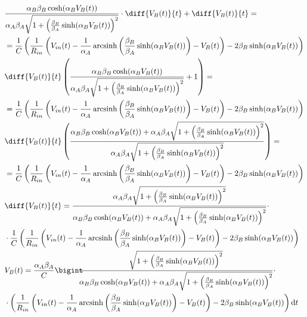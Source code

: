 \documentclass[12pt]{article}
\DeclareMathOperator{\arcsinh}{arcsinh}
\newcommand{\Int}[2]{\bigint \hspace{-6px} #1 \mathrm{d}#2}
\begin{document}
		\begin{equation}
			\label{eq:sostituzione}
			\begin{split}
				&\frac{\alpha_{B}\beta_{B}\cosh(\alpha_{B}V_{B}(t))}{\alpha_{A}\beta_{A}\sqrt{1+\left(\frac{\beta_{B}}{\beta_{A}}\sinh(\alpha_{B}V_{B}(t))\right)^{2}}}\cdot\diff{V_{B}(t)}{t}+\diff{V_{B}(t)}{t} =\\&= \frac{1}{C}\left(\frac{1}{R_{in}}\left(V_{in}(t)-\frac{1}{\alpha_{A}} \arcsinh \left(\frac{\beta_{B}}{\beta_{A}} \sinh(\alpha_{B}V_{B}(t))\right)-V_{B}(t)\right)-2\beta_{B}\sinh(\alpha_{B}V_{B}(t))\right)\\
				&\diff{V_{B}(t)}{t}\left(\frac{\alpha_{B}\beta_{B}\cosh(\alpha_{B}V_{B}(t))}{\alpha_{A}\beta_{A}\sqrt{1+\left(\frac{\beta_{B}}{\beta_{A}}\sinh(\alpha_{B}V_{B}(t))\right)^{2}}}+1\right) =\\&= \frac{1}{C}\left(\frac{1}{R_{in}}\left(V_{in}(t)-\frac{1}{\alpha_{A}} \arcsinh \left(\frac{\beta_{B}}{\beta_{A}} \sinh(\alpha_{B}V_{B}(t))\right)-V_{B}(t)\right)-2\beta_{B}\sinh(\alpha_{B}V_{B}(t))\right)\\
				&\diff{V_{B}(t)}{t}\left(\frac{\alpha_{B}\beta_{B}\cosh(\alpha_{B}V_{B}(t))+\alpha_{A}\beta_{A}\sqrt{1+\left(\frac{\beta_{B}}{\beta_{A}}\sinh(\alpha_{B}V_{B}(t))\right)^{2}}}{\alpha_{A}\beta_{A}\sqrt{1+\left(\frac{\beta_{B}}{\beta_{A}}\sinh(\alpha_{B}V_{B}(t))\right)^{2}}}\right) =\\&= \frac{1}{C}\left(\frac{1}{R_{in}}\left(V_{in}(t)-\frac{1}{\alpha_{A}} \arcsinh \left(\frac{\beta_{B}}{\beta_{A}} \sinh(\alpha_{B}V_{B}(t))\right)-V_{B}(t)\right)-2\beta_{B}\sinh(\alpha_{B}V_{B}(t))\right)\\
				&\diff{V_{B}(t)}{t} = \frac{\alpha_{A}\beta_{A}\sqrt{1+\left(\frac{\beta_{B}}{\beta_{A}}\sinh(\alpha_{B}V_{B}(t))\right)^{2}}}{\alpha_{B}\beta_{B}\cosh(\alpha_{B}V_{B}(t))+\alpha_{A}\beta_{A}\sqrt{1+\left(\frac{\beta_{B}}{\beta_{A}}\sinh(\alpha_{B}V_{B}(t))\right)^{2}}}\cdot\\&\cdot\frac{1}{C}\left(\frac{1}{R_{in}}\left(V_{in}(t)-\frac{1}{\alpha_{A}} \arcsinh \left(\frac{\beta_{B}}{\beta_{A}} \sinh(\alpha_{B}V_{B}(t))\right)-V_{B}(t)\right)-2\beta_{B}\sinh(\alpha_{B}V_{B}(t))\right)\\
				&V_{B}(t) = \frac{\alpha_{A}\beta_{A}}{C}\Int{\frac{\sqrt{1+\left(\frac{\beta_{B}}{\beta_{A}}\sinh(\alpha_{B}V_{B}(t))\right)^{2}}}{\alpha_{B}\beta_{B}\cosh(\alpha_{B}V_{B}(t))+\alpha_{A}\beta_{A}\sqrt{1+\left(\frac{\beta_{B}}{\beta_{A}}\sinh(\alpha_{B}V_{B}(t))\right)^{2}}}\cdot\\&\cdot\left(\frac{1}{R_{in}}\left(V_{in}(t)-\frac{1}{\alpha_{A}} \arcsinh \left(\frac{\beta_{B}}{\beta_{A}} \sinh(\alpha_{B}V_{B}(t))\right)-V_{B}(t)\right)-2\beta_{B}\sinh(\alpha_{B}V_{B}(t))\right)}{t}\\
			\end{split}
		\end{equation}
		
\end{document}
